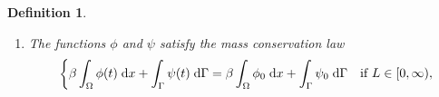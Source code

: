 \documentclass[11pt,reqno]{amsart}
\newtheorem{definition}[theorem]{Definition}
\theoremstyle{remark}
\numberwithin{equation}{section}
\newcommand{\n}{\mathbf{n}}
\newcommand{\intO}{\int_\Omega}
\newcommand{\intG}{\int_\Gamma}
\newcommand{\dx}{\;\mathrm{d}x}
\newcommand{\dxt}{\;\mathrm{d}x\;\mathrm{d}t}
\newcommand{\dGt}{\;\mathrm{d}\Ga\;\mathrm{d}t}
\newcommand{\dG}{\;\mathrm d\Ga}
\newcommand{\deln}{\partial_\n}
\newcommand{\Grad}{\nabla}
\newcommand{\Lap}{\Delta}
\newcommand{\Div}{\textnormal{div}}
\newcommand{\Gradg}{\nabla_\Ga}
\newcommand{\Lapg}{\Delta_\Ga}
\newcommand{\Om}{\Omega}
\newcommand{\Ga}{\Gamma}
\newcommand{\J}{\mathbf J}
\newcommand{\K}{\mathbf K}
\newcommand{\bv}{\mathbf v}
\newcommand{\bw}{\mathbf w}
\newcommand{\wv}{\widehat\bv}
\newcommand{\ww}{\widehat\bw}
\begin{document}
\begin{definition}
\begin{enumerate}[label=\textnormal{(\roman*)}, ref=\thetheorem(\roman*)]
\begin{subequations}
\begin{align}
                &\qquad - \int_0^\infty\intO \phi\bv\cdot\Grad\zeta\dxt - \int_0^\infty\intG \psi\bw\cdot\Gradg\zeta_\Ga\dGt \\
                &\quad= - \int_0^\infty\intO m_\Om(\phi)\Grad\mu\cdot\Grad\zeta\dxt - \int_0^\infty\intG  m_\Ga(\psi)\Gradg\theta\cdot\Gradg\zeta_\Ga\dGt \nonumber \\
                &\qquad - \chi(L)\int_0^\infty\intG(\beta\theta-\mu)(\beta\zeta_\Ga - \zeta)\dGt \nonumber
            \end{align}
        \end{subequations}
        hold for all $(\wv,\ww)\in C_c^\infty(0,\infty;\mathbfcal{H}^2_{0,\Div})$ and all $(\zeta,\zeta_\Ga)\in C_c^\infty(0,\infty;\mathcal{H}^1_{L,\beta})$, where
        \begin{subequations}\label{NSCH:WeakSolution:MuTheta}
        \begin{alignat}{2}
        	&\mu = -\Lap\phi + F^\prime(\phi) &&\qquad\text{a.e.~in~}Q, \\
        	&\theta = -\Lapg\psi + G^\prime(\psi) + \alpha\deln\phi &&\qquad\text{a.e.~on~}\Sigma, \\
        	&K\deln\phi = \alpha\psi - \phi, \qquad K\in[0,\infty],
        	&&\qquad\text{a.e.~on~}\Sigma,
        \end{alignat}
        \end{subequations}
        and
        \begin{alignat*}{2}
        	\rho(\phi) &= \frac{\tilde\rho_2 - \tilde\rho_1}{2}\phi + \frac{\tilde\rho_1 + \tilde\rho_2}{2} &&\qquad\text{a.e.~in~}Q, \\
        	\sigma(\psi) &= \frac{\tilde\sigma_2 - \tilde\sigma_1}{2}\psi + \frac{\tilde\sigma_ 1 + \tilde\sigma_2}{2} &&\qquad\text{a.e.~on~}\Sigma, \\
        	\J &= - \frac{\tilde\rho_2 - \tilde\rho_1}{2}m_\Om(\phi)\Grad\mu &&\qquad\text{a.e.~in~}Q, \\
        	\K &= - \frac{\tilde\sigma_2 - \tilde\sigma_1}{2}m_\Ga(\psi)\Gradg\theta &&\qquad\text{a.e.~on~}\Sigma.
        \end{alignat*}
        \item \label{NSCH:WeakSolution:MCL} The functions $\phi$ and $\psi$ satisfy the mass conservation law
        \begin{align}\label{NSCH:WeakSolution:MassConservationLaw}
            \begin{dcases}
                \beta\intO \phi(t)\dx + \intG \psi(t)\dG = \beta\intO \phi_0 \dx + \intG \psi_0\dG &\textnormal{if~} L\in[0,\infty), \\

\end{dcases}
\end{align}
\end{enumerate}
\end{definition}
\end{document}
